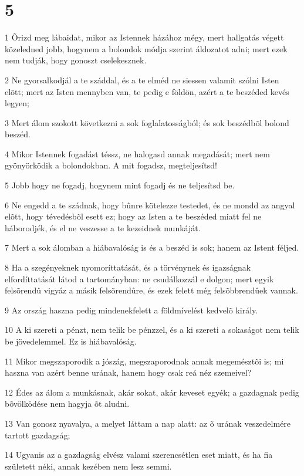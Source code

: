 \chapter{5}

\par 1 Õrizd meg lábaidat, mikor az Istennek házához mégy, mert hallgatás végett közeledned jobb, hogynem a bolondok módja szerint áldozatot adni; mert ezek nem tudják, hogy gonoszt cselekesznek.
\par 2 Ne gyorsalkodjál a te száddal, és a te elméd ne siessen valamit szólni Isten elõtt; mert az Isten mennyben van, te pedig e földön, azért a te beszéded kevés legyen;
\par 3 Mert álom szokott következni a sok foglalatosságból; és sok beszédbõl bolond beszéd.
\par 4 Mikor Istennek fogadást téssz, ne halogasd annak megadását; mert nem gyönyörködik a bolondokban. A mit fogadsz, megteljesítsd!
\par 5 Jobb hogy ne fogadj, hogynem mint fogadj és ne teljesítsd be.
\par 6 Ne engedd a te szádnak, hogy bûnre kötelezze testedet, és ne mondd az angyal elõtt, hogy tévedésbõl esett ez; hogy az Isten a te beszéded miatt fel ne háborodjék, és el ne veszesse a te kezeidnek munkáját.
\par 7 Mert a sok álomban a hiábavalóság is és a beszéd is sok; hanem az Istent féljed.
\par 8 Ha a szegényeknek nyomoríttatását, és a törvénynek és igazságnak elfordíttatását látod a tartományban: ne csudálkozzál e dolgon; mert egyik felsõrendû vigyáz a másik felsõrendûre, és ezek felett még felsõbbrendûek vannak.
\par 9 Az ország haszna pedig mindenekfelett a földmívelést kedvelõ király.
\par 10 A ki szereti a pénzt, nem telik be pénzzel, és a ki szereti a sokaságot nem telik be jövedelemmel. Ez is hiábavalóság.
\par 11 Mikor megszaporodik a jószág, megszaporodnak annak megemésztõi is; mi haszna van azért benne urának, hanem hogy csak reá néz szemeivel?
\par 12 Édes az álom a munkásnak, akár sokat, akár keveset egyék; a gazdagnak pedig bõvölködése nem hagyja õt aludni.
\par 13 Van gonosz nyavalya, a melyet láttam a nap alatt: az õ urának veszedelmére tartott gazdagság;
\par 14 Ugyanis az a gazdagság elvész valami szerencsétlen eset miatt, és ha fia született néki, annak kezében nem lesz semmi.
